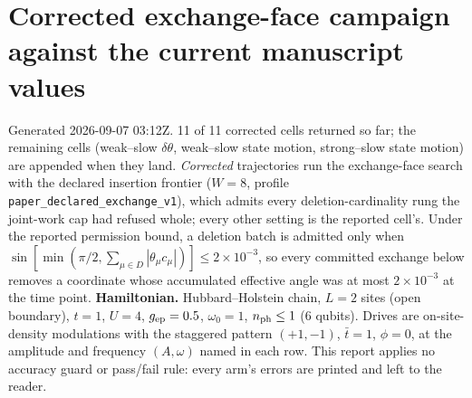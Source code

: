 \documentclass[10pt]{article}
\begin{document}
\section*{Corrected exchange-face campaign against the current manuscript values}
Generated 2026-09-07 03:12Z.  11 of 11 corrected cells returned so far; the remaining cells (weak--slow $\delta\theta$, weak--slow state motion, strong--slow state motion) are appended when they land.  \emph{Corrected} trajectories run the exchange-face search with the declared insertion frontier ($W=8$, profile \texttt{paper\_declared\_exchange\_v1}), which admits every deletion-cardinality rung the joint-work cap had refused whole; every other setting is the reported cell's.  Under the reported permission bound, a deletion batch is admitted only when $\sin[\min(\pi/2,\sum_{\mu\in D}|\theta_\mu c_\mu|)]\le2\times10^{-3}$, so every committed exchange below removes a coordinate whose accumulated effective angle was at most $2\times10^{-3}$ at the time point.
\textbf{Hamiltonian.} Hubbard--Holstein chain, $L=2$ sites (open boundary), $t=1$, $U=4$, $g_{\rm ep}=0.5$, $\omega_0=1$, $n_{\rm ph}\le1$ (6 qubits).  Drives are on-site-density modulations with the staggered pattern $(+1,-1)$, $\bar t=1$, $\phi=0$, at the amplitude and frequency $(A,\omega)$ named in each row.
This report applies no accuracy guard or pass/fail rule: every arm's errors are printed and left to the reader.
\end{document}

